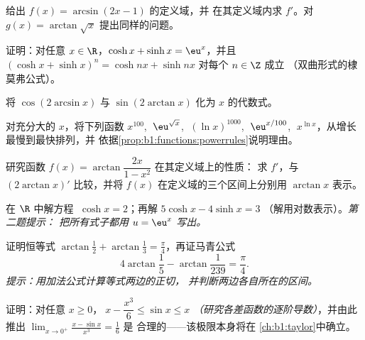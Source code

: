 \begin{exercise}[$\star$]\label{exo:b1:functions:2}
给出 $f(x) = \arcsin(2x - 1)$ 的定义域，并
在其定义域内求 $f'$。对 $g(x) = \arctan\sqrt{x}$ 提出同样的问题。
\end{exercise}

\begin{exercise}[$\star$]\label{exo:b1:functions:3}
证明：对任意 $x \in \R$，$\cosh x + \sinh x = \eu^x$，并且
$(\cosh x + \sinh x)^n = \cosh nx + \sinh nx$ 对每个 $n \in \Z$ 成立
（双曲形式的棣莫弗公式）。
\end{exercise}

\begin{exercise}[$\star$]\label{exo:b1:functions:4}
将 $\cos(2\arcsin x)$ 与 $\sin(2\arctan x)$ 化为
$x$ 的代数式。
\end{exercise}

\begin{exercise}[$\star$]\label{exo:b1:functions:5}
对充分大的 $x$，将下列函数
$x^{100}$, $\;\eu^{\sqrt x}$, $\;(\ln x)^{1000}$, $\;\eu^{x/100}$,
$\;x^{\ln x}$，从增长最慢到最快排列，并
依据\cref{prop:b1:functions:powerrules}说明理由。
\end{exercise}

\begin{exercise}[$\star\star$]\label{exo:b1:functions:6}
研究函数 $f(x) = \arctan\dfrac{2x}{1 - x^2}$ 在其定义域上的性质：
求 $f'$，与 $(2\arctan x)'$ 比较，并将 $f(x)$
在定义域的三个区间上分别用 $\arctan x$ 表示。
\end{exercise}

\begin{exercise}[$\star\star$]\label{exo:b1:functions:7}
在 $\R$ 中解方程 $\;\cosh x = 2$；再解 $5\cosh x - 4 \sinh x = 3$
（解用对数表示）。\emph{第二题提示：
把所有式子都用 $u = \eu^x$ 写出。}
\end{exercise}

\begin{exercise}[$\star\star$]\label{exo:b1:functions:8}
证明恒等式 $\arctan\frac{1}{2} + \arctan\frac{1}{3} =
\frac{\pi}{4}$，再证马青公式
\[
4\arctan\frac 15 - \arctan\frac{1}{239} = \frac{\pi}{4}.
\]
\emph{提示：用加法公式计算等式两边的正切，
并判断两边各自所在的区间。}
\end{exercise}

\begin{exercise}[$\star\star$]\label{exo:b1:functions:9}
证明：对任意 $x \geq 0$，$\;x - \dfrac{x^3}{6} \leq \sin x \leq
x$ \emph{（研究各差函数的逐阶导数）}，并由此
推出 $\lim_{x \to 0^+} \frac{x - \sin x}{x^3} = \frac 16$ 是
合理的——该极限本身将在
\cref{ch:b1:taylor}中确立。
\end{exercise}

